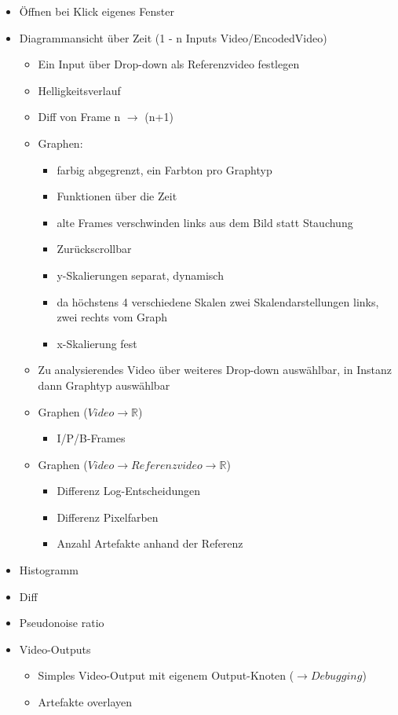 \documentclass{article}
\begin{document}
\begin{itemize}
  \item Öffnen bei Klick eigenes Fenster
  \item Diagrammansicht über Zeit (1 - n Inputs Video/EncodedVideo)
\begin{itemize}
    \item Ein Input über Drop-down als Referenzvideo festlegen
    \item Helligkeitsverlauf
    \item Diff von Frame n $\rightarrow$ (n+1)
    \item Graphen:
\begin{itemize}
      \item farbig abgegrenzt, ein Farbton pro Graphtyp
      \item Funktionen über die Zeit
      \item alte Frames verschwinden links aus dem Bild statt Stauchung
      \item Zurückscrollbar
      \item y-Skalierungen separat, dynamisch
      \item da höchstens 4 verschiedene Skalen zwei Skalendarstellungen links, zwei rechts vom Graph
      \item x-Skalierung fest
\end{itemize}
    \item Zu analysierendes Video über weiteres Drop-down auswählbar, in Instanz dann Graphtyp auswählbar
    \item Graphen ($Video \rightarrow \mathbb{R}$)
\begin{itemize}
      \item I/P/B-Frames
\end{itemize}
    \item Graphen ($Video \rightarrow Referenzvideo \rightarrow \mathbb{R}$)
\begin{itemize}
      \item Differenz Log-Entscheidungen
      \item Differenz Pixelfarben
      \item Anzahl Artefakte anhand der Referenz
\end{itemize}
\end{itemize}
  \item Histogramm
  \item Diff
  \item Pseudonoise ratio
  \item Video-Outputs
\begin{itemize}
    \item Simples Video-Output mit eigenem Output-Knoten ($\rightarrow Debugging$)
    \item Artefakte overlayen
\end{itemize}
\end{itemize}
\end{document}
